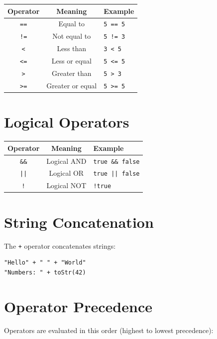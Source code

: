 \documentclass[11pt,twoside,openright]{book}
\begin{document}
\begin{center}
\begin{tabular}{|c|c|l|}
\hline
\textbf{Operator} & \textbf{Meaning} & \textbf{Example} \\
\hline
\texttt{==} & Equal to & \texttt{5 == 5} \\
\texttt{!=} & Not equal to & \texttt{5 != 3} \\
\texttt{<} & Less than & \texttt{3 < 5} \\
\texttt{<=} & Less or equal & \texttt{5 <= 5} \\
\texttt{>} & Greater than & \texttt{5 > 3} \\
\texttt{>=} & Greater or equal & \texttt{5 >= 5} \\
\hline
\end{tabular}
\end{center}

\section{Logical Operators}

\begin{center}
\begin{tabular}{|c|c|l|}
\hline
\textbf{Operator} & \textbf{Meaning} & \textbf{Example} \\
\hline
\texttt{\&\&} & Logical AND & \texttt{true \&\& false} \\
\texttt{||} & Logical OR & \texttt{true || false} \\
\texttt{!} & Logical NOT & \texttt{!true} \\
\hline
\end{tabular}
\end{center}

\section{String Concatenation}

The \texttt{+} operator concatenates strings:

\begin{lstlisting}[language=ConstructLang]
"Hello" + " " + "World"
"Numbers: " + toStr(42)
\end{lstlisting}

\section{Operator Precedence}

Operators are evaluated in this order (highest to lowest precedence):
\end{document}
